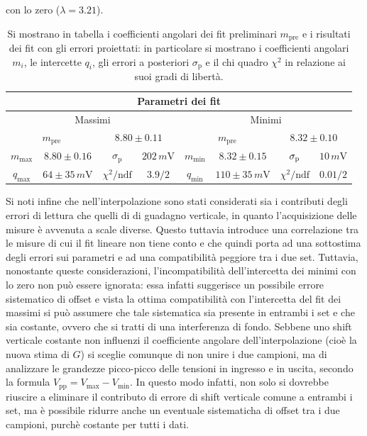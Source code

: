\documentclass[a4paper,11pt]{article}
\begin{document}
con lo zero ($\lambda = 3.21$).
\begin{table}[h]
\centering
\setlength{\tabcolsep}{10pt}
\begin{tabular}{ | c c | c c | c c | c c|  }
\hline
  \multicolumn{8}{|c|}{Parametri dei fit} \\
  \hline
  \multicolumn{4}{|c|}{Massimi} &
  \multicolumn{4}{c|}{Minimi} \\
  \hline
  \multicolumn{2}{|c}{$m_{\text{pre}}$} & \multicolumn{2}{c|}{$8.80 \pm 0.11$} &
  \multicolumn{2}{c}{$m_{\text{pre}}$} & \multicolumn{2}{c|}{$8.32 \pm 0.10$} \\
  $m_{\text{max}}$   &   $8.80 \pm 0.16$             &   $\sigma_{\text{p}}$              &   $ 202 \,\si{m\volt}$   &   $m_{\text{min}}$   & $8.32 \pm 0.15 $            &  $\sigma_{\text p}$             & $10 \,\si{m\volt}$ \\
  $q_{\text{max}}$   &   $ 64 \pm 35 \,\si{m\volt}$   &   $\chi^{2}/\text{ndf}$           &   $3.9/2$   &   $q_{\text{min}}$   & $110 \pm 35 \, \si{m\volt}$  & $\chi^{2} / \text{ndf}$        & $0.01/2$ \\
\hline
\end{tabular}
\caption{\footnotesize Si mostrano in tabella i coefficienti angolari dei fit preliminari
  $m_{\text{pre}}$ e i risultati dei fit con gli errori proiettati: in particolare si mostrano i
  coefficienti angolari $m_{i}$, le intercette $q_{i}$, gli errori a posteriori
  $\sigma_{\text{p}}$ e il chi quadro $\chi^{2}$ in relazione ai suoi gradi di libertà.}
\label{tab:fitmaxmin}
\end{table}

\noindent Si noti infine che nell'interpolazione sono stati considerati
sia i contributi degli errori di lettura che quelli di di guadagno verticale, in quanto
l'acquisizione delle misure è avvenuta a scale diverse. Questo tuttavia introduce una
correlazione tra le misure di cui il fit lineare non tiene conto e che quindi porta ad una
sottostima degli errori sui parametri e ad una compatibilità peggiore tra i due set.
Tuttavia, nonostante queste considerazioni, l'incompatibilità dell'intercetta dei minimi con
lo zero non può essere ignorata: essa infatti suggerisce un possibile errore sistematico di offset e vista la ottima compatibilità con l'intercetta del fit dei massimi si può assumere che
tale sistematica sia presente in entrambi i set e che sia costante, ovvero che si tratti di
una interferenza di fondo. Sebbene uno shift verticale costante non influenzi il coefficiente angolare dell'interpolazione (cioè la nuova stima di $G$) si sceglie comunque di non
unire i due campioni, ma di analizzare le grandezze picco-picco delle tensioni in ingresso e in uscita,
secondo la formula $V_{\text{pp}}=V_{\text{max}} - V_{\text{min}}$. In questo modo infatti, non solo si dovrebbe
riuscire a eliminare il contributo di errore di shift verticale comune a
entrambi i set, ma è possibile ridurre anche un eventuale sistematicha di offset tra i due campioni, purchè
costante per tutti i dati.\\
\end{document}
